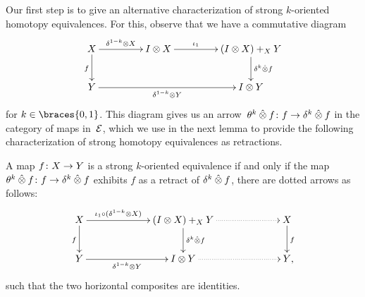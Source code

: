 \documentclass[reqno,10pt,a4paper,oneside,draft]{amsart}
\begin{document}
{{Our first step is to give an alternative characterization of strong $k$-oriented homotopy equivalences.
For this, observe that we have a commutative diagram 
\begin{equation}
\label{equ:thetak}
\begin{gathered}
\xymatrix@C+2em{
  X
  \ar[r]^-{\kcylinv \otimes X}
  \ar[d]_{f}
&
 \interval \otimes X 
 \ar[r]^-{\iota_1} 
 &
  (\interval \otimes X) +_X Y \ar[d]^{\kcyl \hatotimes f} 
  \\
  Y
  \ar[rr]_-{\kcylinv \otimes Y}
  & 
&
  \interval \otimes Y
}
\end{gathered}
\end{equation}
for $k \in \braces{0, 1}$. This diagram gives us an arrow~$\theta^k \mathbin{\hat{\otimes}} f \colon f \to \delta^k \mathbin{\hat{\otimes}} f$ in the category of maps 
in~$\mathcal{E}$, which we use in the next lemma to provide the following characterization of strong homotopy equivalences as retractions. 

\begin{lemma} \label{strong-h-equiv-as-section-non-alg}
A map $f \colon X \to Y$ is a strong $k$-oriented equivalence 
if and only if  the map $\theta^k \mathbin{\hat{\otimes}} f  \colon f \to \delta^k \mathbin{\hat{\otimes}} f$ exhibits $f$ as a retract of $\delta^k \mathbin{\hat{\otimes}} f$, \ie there are
dotted arrows as follows:
\[
\xymatrix@C+4em{
  X
  \ar[r]^-{\iota_1 \cc (\kcylinv \otimes X)}
  \ar[d]_f
&
  (\interval \otimes X) +_X Y
  \ar[d]^{\kcyl \hatotimes f}
  \ar@{.>}[r]
&
  X
  \ar[d]^f
\\
  Y
  \ar[r]_-{\kcylinv \otimes Y}
&
  \interval \otimes Y
  \ar@{.>}[r]
&
  Y
\rlap{,}}
\]
such that the two horizontal composites are identities.
\end{lemma}

}}
\end{document}
